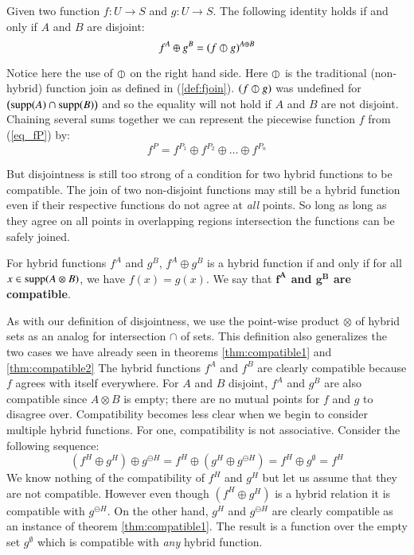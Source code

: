 \begin{theorem}
	\label{thm:compatible2}
	Given two function $f : U \to S$ and $g : U \to S$. The following identity holds if and only if $A$ and $B$ are disjoint:
	\begin{equation}
		f^A \oplus g^B = (f \varobar g)^{A \oplus B}
	\end{equation}
\end{theorem}


Notice here the use of $\varobar$ on the right hand side.
Here $\varobar$ is the traditional (non-hybrid) function join as defined in (\ref{def:fjoin}).
$(f \varobar g)$ was undefined for $\left( \text{supp}(A) \cap \text{supp}(B) \right)$ 
and so the equality will not hold if $A$ and $B$ are not disjoint.
Chaining several sums together we can represent the piecewise function $f$ from (\ref{eq_fP}) by:
\begin{equation*}
 	f^P = f^{P_1} \oplus f^{P_2} \oplus \ldots \oplus f^{P_n}
\end{equation*}



But disjointness is still too strong of a condition for two hybrid functions to be compatible.
The join of two non-disjoint functions may still be a hybrid function 
even if their respective functions do not agree at \emph{all} points.
So long as long as they agree on all points in overlapping regions intersection the functions can be safely joined.


\begin{definition}
	For hybrid functions $f^A$ and $g^B$, $f^A \oplus g^B$ is a hybrid function
	if and only if for all $x \in \text{supp} (A \otimes B)$, we have $f(x) = g(x)$.
	We say that \textbf{$\boldsymbol{f^A}$ and $\boldsymbol{g^B}$ are compatible}.
\end{definition}


As with our definition of disjointness, we use the point-wise product $\otimes$ 
of hybrid sets as an analog for intersection $\cap$ of sets.
This definition also generalizes the two cases we have already seen in theorems 
\ref{thm:compatible1} and \ref{thm:compatible2}
The hybrid functions $f^A$ and $f^B$ are clearly compatible because $f$ agrees with itself everywhere.
For $A$ and $B$ disjoint, $f^A$ and $g^B$ are also compatible since $A \otimes B$ is empty;
there are no mutual points for $f$ and $g$ to disagree over.
Compatibility becomes less clear when we begin to consider multiple hybrid functions.
For one, compatibility is not associative.
Consider the following sequence:
\begin{equation*}
	(f^H \oplus g^H) \oplus g^{\ominus H} 
	= f^H \oplus (g^H \oplus g^{\ominus H}) 
	= f^H \oplus g^\emptyset = f^H
\end{equation*}
We know nothing of the compatibility of $f^H$ and $g^H$ but let us assume that they are not compatible.
However even though $(f^H \oplus g^H)$ is a hybrid relation it is compatible with $g^{\ominus H}$.
On the other hand, $g^H$ and $g^{\ominus H}$ are clearly compatible as an instance of theorem \ref{thm:compatible1}.
The result is a function over the empty set $g^{\emptyset}$ which is compatible with \emph{any} hybrid function.




